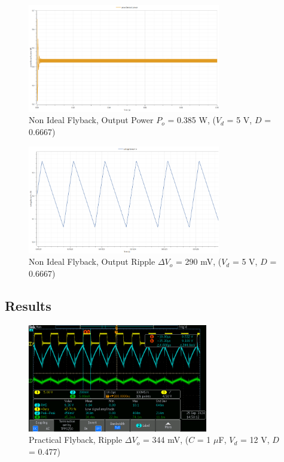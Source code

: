 \documentclass[12pt,twoside]{scrartcl}
\begin{document}
\begin{figure}[htp]
    \centering
    \includegraphics[width=0.75\textwidth]{PowerNonIdealSim12V.png}
    \caption{Non Ideal Flyback, Output Power $P_o$ = 0.385 W, ($V_d$ = 5 V, $D$ = 0.6667)}
    \label{fig:PowerNonIdealSim5V}
\end{figure}

\begin{figure}[htp]
    \centering
    \includegraphics[width=0.75\textwidth]{RippleNonIdealSim5V.png}
    \caption{Non Ideal Flyback, Output Ripple $\Delta V_o$ = 290 mV, ($V_d$ = 5 V, $D$ = 0.6667)}
    \label{fig:RippleNonIdealSim5V}
\end{figure}
\newpage
\subsection{Results}

\begin{figure}[htp]
    \centering
    \includegraphics[width=0.7\textwidth]{Flyback/tek0001.png}
    \caption{Practical Flyback, Ripple $\Delta V_o$ = 344 mV, ($C$ = 1 $\mu$F, $V_d$ = 12 V, $D$ = 0.477)}
    \label{fig:Practical1}
\end{figure}
\end{document}
